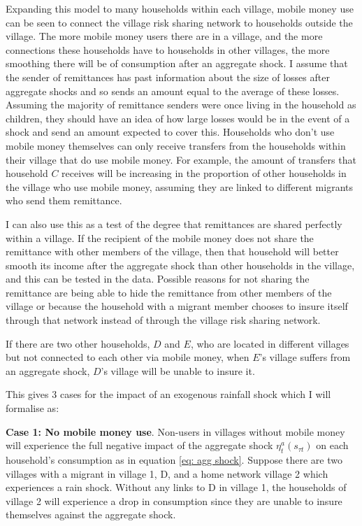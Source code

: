 Expanding this model to many households within each village, mobile money use can be seen to connect the village risk sharing network to households outside the village. The more mobile money users there are in a village, and the more connections these households have to households in other villages, the more smoothing there will be of consumption after an aggregate shock. I assume that the sender of remittances has past information about the size of losses after aggregate shocks and so sends an amount equal to the average of these losses. Assuming the majority of remittance senders were once living in the household as children, they should have an idea of how large losses would be in the event of a shock and send an amount expected to cover this.  Households who don't use mobile money themselves can only receive transfers from the households within their village that do use mobile money. For example, the amount of transfers that household $C$ receives will be increasing in the proportion of other households in the village who use mobile money, assuming they are linked to different migrants who send them remittance. 

I can also use this as a test of the degree that remittances are shared perfectly within a village. If the recipient of the mobile money does not share the remittance with other members of the village, then that household will better smooth its income after the aggregate shock than other households in the village, and this can be tested in the data. Possible reasons for not sharing the remittance are being able to hide the remittance from other members of the village or because the household with a migrant member chooses to insure itself through that network instead of through the village risk sharing network. 

If there are two other households, $D$ and $E$, who are located in different villages but not connected to each other via mobile money, when $E$'s village suffers from an aggregate shock, $D$'s village will be unable to insure it. 

This gives 3 cases for the impact of an exogenous rainfall shock which I will formalise as: 

\textbf{Case 1: No mobile money use}. Non-users in villages without mobile money will experience the full negative impact of the aggregate shock $\eta_t^a(s_{\tau t})$  on each household's consumption as in equation \eqref{eq: agg shock}.  Suppose there are two villages with a migrant in village 1, D, and a home network village 2 which experiences a rain shock. Without any links to D in village 1, the households of village 2 will experience a drop in consumption since they are unable to insure themselves against the aggregate shock. 

